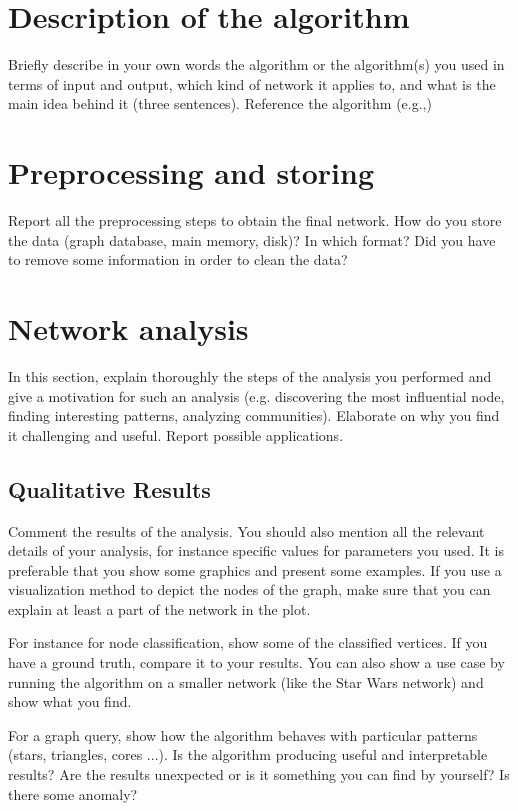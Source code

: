 \documentclass[11pt,a4paper,onecolumn,notitlepage]{article}
\begin{document}
\section{Description of the algorithm}

Briefly describe in your own words the algorithm or the algorithm(s) you used in terms of input and output, which kind of network it applies to, and what is the main idea behind it (three sentences). Reference the algorithm (e.g.,\cite{zhao2007graph})

\section{Preprocessing and storing}

Report all the preprocessing steps to obtain the final network. How do you store the data (graph database, main memory, disk)? In which format? Did you have to remove some information in order to clean the data? 

\section{Network analysis}

In this section, explain thoroughly the steps of the analysis you performed and give a motivation for such an analysis (e.g. discovering the most influential node, finding interesting patterns, analyzing communities). Elaborate on why you find it challenging and useful. Report possible applications.  

\subsection{Qualitative Results}

Comment the results of the analysis. You should also mention all the relevant details of your analysis, for instance specific values for parameters you used. It is preferable that you show some graphics and present some examples. If you use a visualization method to depict the nodes of the graph, make sure that you can explain at least a part of the network in the plot. 

For instance for node classification, show some of the classified vertices. If you have a ground truth, compare it to your results. You can also show a use case by running the algorithm on a smaller network (like the Star Wars network) and show what you find. 

For a graph query, show how the algorithm behaves with particular patterns (stars, triangles, cores ...).  Is the algorithm producing useful and interpretable results? Are the results unexpected or is it something you can find by yourself? Is there some anomaly?
\end{document}
